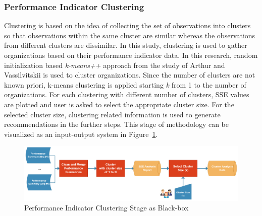 \subsubsection{Performance Indicator Clustering}
\label{subsubsec:performance-indicator-clustering}
Clustering is based on the idea of collecting the set of observations into clusters so that observations within the same cluster are similar whereas the observations from different clusters are dissimilar. In this study, clustering is used to gather organizations based on their performance indicator data. In this research, random initialization based \textit{k-means++} approach from the study of Arthur and Vassilvitskii \cite{arthur2007} is used to cluster organizations. Since the number of clusters are not known priori, k-means clustering is applied starting \textit{k} from 1 to the number of organizations. For each clustering with different number of clusters, SSE values are plotted and user is asked to select the appropriate cluster size. For the selected cluster size, clustering related information is used to generate recommendations in the further steps. This stage of methodology can be visualized as an input-output system in Figure~\ref{fig:performance-indicator-clustering-blackbox}. 
\begin{figure}
  \centering
  \includegraphics[width=\textwidth]{4_methodology/performance-indicator-clustering-blackbox}
  \caption{Performance Indicator Clustering Stage as Black-box }
  \label{fig:performance-indicator-clustering-blackbox}
\end{figure}

